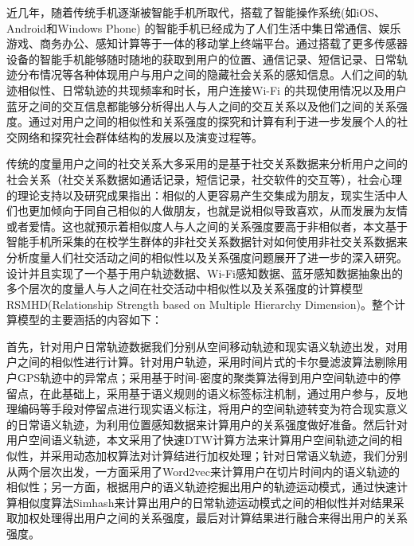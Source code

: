 \begin{cabstract}
近几年，随着传统手机逐渐被智能手机所取代，搭载了智能操作系统(如iOS、Android和Windows Phone) 的智能手机已经成为了人们生活中集日常通信、娱乐游戏、商务办公、感知计算等于一体的移动掌上终端平台。通过搭载了更多传感器设备的智能手机能够随时随地的获取到用户的位置、通信记录、短信记录、日常轨迹分布情况等各种体现用户与用户之间的隐藏社会关系的感知信息。人们之间的轨迹相似性、日常轨迹的共现频率和时长，用户连接Wi-Fi 的共现使用情况以及用户蓝牙之间的交互信息都能够分析得出人与人之间的交互关系以及他们之间的关系强度。通过对用户之间的相似性和关系强度的探究和计算有利于进一步发展个人的社交网络和探究社会群体结构的发展以及演变过程等。
\par 传统的度量用户之间的社交关系大多采用的是基于社交关系数据来分析用户之间的社会关系（社交关系数据如通话记录，短信记录，社交软件的交互等），社会心理的理论支持以及研究成果指出：相似的人更容易产生交集成为朋友，现实生活中人们也更加倾向于同自己相似的人做朋友，也就是说相似导致喜欢，从而发展为友情或者爱情。这也就预示着相似度人与人之间的关系强度要高于非相似者，本文基于智能手机所采集的在校学生群体的非社交关系数据针对如何使用非社交关系数据来分析度量人们社交活动之间的相似性以及关系强度问题展开了进一步的深入研究。设计并且实现了一个基于用户轨迹数据、Wi-Fi感知数据、蓝牙感知数据抽象出的多个层次的度量人与人之间在社交活动中相似性以及关系强度的计算模型RSMHD(Relationship Strength based on Multiple Hierarchy Dimension)。整个计算模型的主要涵括的内容如下：
\par 首先，针对用户日常轨迹数据我们分别从空间移动轨迹和现实语义轨迹出发，对用户之间的相似性进行计算。针对用户轨迹，采用时间片式的卡尔曼滤波算法剔除用户GPS轨迹中的异常点；采用基于时间-密度的聚类算法得到用户空间轨迹中的停留点，在此基础上，采用基于语义规则的语义标签标注机制，通过用户参与，反地理编码等手段对停留点进行现实语义标注，将用户的空间轨迹转变为符合现实意义的日常语义轨迹，为利用位置感知数据来计算用户的关系强度做好准备。然后针对用户空间语义轨迹，本文采用了快速DTW计算方法来计算用户空间轨迹之间的相似性，并采用动态加权算法对计算结进行加权处理；针对日常语义轨迹，我们分别从两个层次出发，一方面采用了Word2vec来计算用户在切片时间内的语义轨迹的相似性；另一方面，根据用户的语义轨迹挖掘出用户的轨迹运动模式，通过快速计算相似度算法Simhash来计算出用户的日常轨迹运动模式之间的相似性并对结果采取加权处理得出用户之间的关系强度，最后对计算结果进行融合来得出用户的关系强度。


\end{cabstract}
